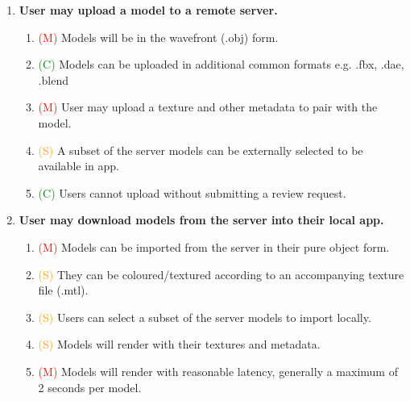 \documentclass{article}
\newcommand{\must}[1]{\textcolor{red}{#1}}
\newcommand{\should}[1]{\textcolor{orange}{#1}}
\newcommand{\could}[1]{\textcolor{green}{#1}}
\begin{document}
\begin{enumerate}[label=\Roman*.]
\item \textbf{User may upload a model to a remote server.}
    \begin{enumerate}[label=\arabic*.]
    \item \must{(M)} Models will be in the wavefront (.obj) form.
    \item \could{(C)} Models can be uploaded in additional common formats e.g. .fbx, .dae, .blend
    \item \must{(M)} User may upload a texture and other metadata to pair with the model.
    \item \should{(S)} A subset of the server models can be externally selected to be available in app.
    \item \could{(C)} Users cannot upload without submitting a review request.
    \end{enumerate}
    
\item \textbf{User may download models from the server into their local app.}
    \begin{enumerate}[label=\arabic*.]
    \item \must{(M)} Models can be imported from the server in their pure object form.
    \item \should{(S)} They can be coloured/textured according to an accompanying texture file (.mtl).
    \item \should{(S)} Users can select a subset of the server models to import locally.
    \item \should{(S)} Models will render with their textures and metadata.
    \item \must{(M)} Models will render with reasonable latency, generally a maximum of 2 seconds per model.
    \end{enumerate}


\end{enumerate}
\end{document}
